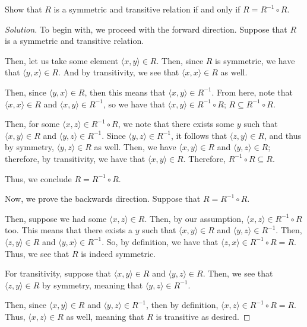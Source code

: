 \documentclass{article}
\newenvironment{solution}{\begin{proof}[Solution]}{\end{proof}}
\renewcommand\qedsymbol{$\blacksquare$}
\newenvironment{innerproof}{\renewcommand{\qedsymbol}{$\square$}\proof}{\endproof}
\newcommand{\ang}[1]{\langle {#1} \rangle}
\begin{document}
	\begin{hw}{33}
		Show that $R$ is a symmetric and transitive relation if and only if $R = R^{-1} \circ R$.
	\end{hw}
	\begin{solution}
		To begin with, we proceed with the forward direction.
		\begin{innerproof}
			Suppose that $R$ is a symmetric and transitive relation.
			
			Then, let us take some element $\ang{x,y} \in R$. Then, since $R$ is symmetric, we have that $\ang{y,x} \in R$. And by transitivity, we see that $\ang{x,x} \in R$ as well.
			
			Then, since $\ang{y,x} \in R$, then this means that $\ang{x,y} \in R^{-1}$. From here, note that $\ang{x,x} \in R$ and $\ang{x,y} \in R^{-1}$, so we have that $\ang{x,y} \in R^{-1} \circ R$; $R \subseteq R^{-1} \circ R$.
			
			Then, for some $\ang{x,z} \in R^{-1} \circ R$, we note that there exists some $y$ such that $\ang{x,y} \in R$ and $\ang{y,z} \in R^{-1}$. Since $\ang{y,z} \in R^{-1}$, it follows that $\ang{z,y} \in R$, and thus by symmetry, $\ang{y,z} \in R$ as well. Then, we have $\ang{x,y} \in R$ and $\ang{y,z} \in R$; therefore, by transitivity, we have that $\ang{x,y} \in R$. Therefore, $R^{-1} \circ R \subseteq R$.
			
			Thus, we conclude $R = R^{-1} \circ R$.
		\end{innerproof}
	
		Now, we prove the backwards direction.
		\begin{innerproof}
			Suppose that $R = R^{-1} \circ R$.
			
			Then, suppose we had some $\ang{x,z} \in R$. Then, by our assumption, $\ang{x,z} \in R^{-1} \circ R$ too. This means that there exists a $y$ such that $\ang{x,y} \in R$ and $\ang{y,z} \in R^{-1}$. Then, $\ang{z,y} \in R$ and $\ang{y,x} \in R^{-1}$. So, by definition, we have that $\ang{z,x} \in R^{-1} \circ R = R$. Thus, we see that $R$ is indeed symmetric.
			
			For transitivity, suppose that $\ang{x,y} \in R$ and $\ang{y,z} \in R$. Then, we see that $\ang{z,y} \in R$ by symmetry, meaning that $\ang{y,z} \in R^{-1}$.
			
			Then, since $\ang{x,y} \in R$ and $\ang{y,z} \in R^{-1}$, then by definition, $\ang{x,z} \in R^{-1} \circ R = R$. Thus, $\ang{x,z} \in R$ as well, meaning that $R$ is transitive as desired.
		\end{innerproof}
	\end{solution}
\end{document}
